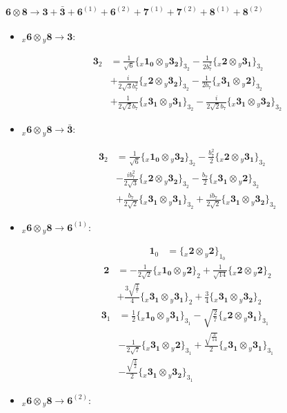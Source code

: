 \documentclass[english]{article}
\newcommand{\cgEqFontsize}{\large}
\newcommand{\rep}[1]{\mathbf{#1}}
\newcommand{\repx}[2]{{}_{#2}\mathbf{#1}}
\newcommand{\tsprod}[2]{\rep{#1}\otimes\rep{#2}}
\newcommand{\tsprodx}[2]{\repx{#1}{x}\otimes\repx{#2}{y}}
\newcommand{\subcgs}[3]{\big\{ \tsprodx{#1}{#2}\big\}^{}_{#3}}
\newcommand{\bfl}{\begin{fleqn}[25pt]}
\newcommand{\efl}{\end{fleqn}}
\begin{document}
\paragraph*{\cgEqFontsize $\tsprod{6}{8}\to\rep{3}+\rep{\bar{3}}+\rep{6}^{(1)}+\rep{6}^{(2)}+\rep{7}^{(1)}+\rep{7}^{(2)}+\rep{8}^{(1)}+\rep{8}^{(2)}$}
\begin{itemize}
\item $\tsprodx{6}{8}\to\rep{3}$:
\bfl
\begin{align*}
\rep{3}_{2} & = \frac{1}{\sqrt{6}}\subcgs{1_{0}}{3_{2}}{3_{2}}-\frac{1}{2 b_7^2}\subcgs{2}{3_{1}}{3_{2}} \\ 
 & +\frac{i}{2 \sqrt{3} b_7^2}\subcgs{2}{3_{2}}{3_{2}}-\frac{1}{2 b_7}\subcgs{3_{1}}{2}{3_{2}} \\ 
 & +\frac{1}{2 \sqrt{2} b_7}\subcgs{3_{1}}{3_{1}}{3_{2}}-\frac{i}{2 \sqrt{2} b_7}\subcgs{3_{1}}{3_{2}}{3_{2}}
\end{align*}
\efl
\item $\tsprodx{6}{8}\to\rep{\bar{3}}$:
\bfl
\begin{align*}
\rep{3}_{2} & = \frac{1}{\sqrt{6}}\subcgs{1_{0}}{3_{2}}{3_{2}}-\frac{b_7^2}{2}\subcgs{2}{3_{1}}{3_{2}} \\ 
 & -\frac{i b_7^2}{2 \sqrt{3}}\subcgs{2}{3_{2}}{3_{2}}-\frac{b_7}{2}\subcgs{3_{1}}{2}{3_{2}} \\ 
 & +\frac{b_7}{2 \sqrt{2}}\subcgs{3_{1}}{3_{1}}{3_{2}}+\frac{i b_7}{2 \sqrt{2}}\subcgs{3_{1}}{3_{2}}{3_{2}}
\end{align*}
\efl
\item $\tsprodx{6}{8}\to\rep{6}^{(1)}$:
\bfl
\begin{align*}
\rep{1}_{0} & = \subcgs{2}{2}{1_{0}}
\end{align*}
\begin{align*}
\rep{2} & = -\frac{1}{2 \sqrt{2}}\subcgs{1_{0}}{2}{2}+\frac{1}{\sqrt{14}}\subcgs{2}{2}{2} \\ 
 & +\frac{3 \sqrt{\frac{3}{7}}}{4}\subcgs{3_{1}}{3_{1}}{2}+\frac{3}{4}\subcgs{3_{1}}{3_{2}}{2}
\end{align*}
\begin{align*}
\rep{3}_{1} & = \frac{1}{2}\subcgs{1_{0}}{3_{1}}{3_{1}}-\sqrt{\frac{2}{7}}\subcgs{2}{3_{1}}{3_{1}} \\ 
 & -\frac{1}{2 \sqrt{7}}\subcgs{3_{1}}{2}{3_{1}}+\frac{\sqrt{\frac{3}{14}}}{2}\subcgs{3_{1}}{3_{1}}{3_{1}} \\ 
 & -\frac{\sqrt{\frac{3}{2}}}{2}\subcgs{3_{1}}{3_{2}}{3_{1}}
\end{align*}
\efl
\item $\tsprodx{6}{8}\to\rep{6}^{(2)}$:

\end{itemize}
\end{document}
